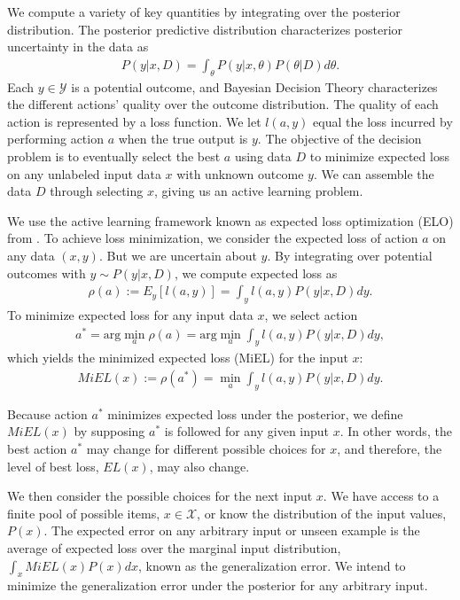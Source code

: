 \documentclass[a4paper,11pt]{article}
\begin{document}
We compute a variety of key quantities by integrating over the posterior distribution. The posterior predictive distribution characterizes posterior uncertainty in the data as
\begin{align} 
P(y|x,D) = \int_\theta P(y|x,\theta)P(\theta|D)d\theta .
\end{align}
Each $y \in \mathcal{Y}$ is a potential outcome, and Bayesian Decision Theory characterizes the different actions' quality over the outcome distribution. The quality of each action is represented by a loss function. We let $l(a,y)$ equal the loss incurred by performing action $a$ when the true output is $y$. The objective of the decision problem is to eventually select the best $a$ using data $D$ to minimize expected loss on any unlabeled input data $x$ with unknown outcome $y$. We can assemble the data $D$ through selecting $x$, giving us an active learning problem.

We use the active learning framework known as expected loss optimization (ELO) from \cite{long2010elo}. To achieve loss minimization, we consider the expected loss of action $a$ on any data  $(x,y)$. But we are uncertain about $y$. By integrating over potential outcomes with $y \sim P(y|x,D)$, we compute expected loss as
\begin{align}
\rho(a) := E_{y} \left[ l(a,y) \right] = \int_y l(a,y) P(y|x,D) dy .
\end{align}To minimize expected loss for any input data $x$, we select action
\begin{align}
a^{*} = \text{arg}\min_a \rho(a) = \text{arg}\min_a \int_y l(a,y) P(y|x,D) dy,
\end{align}which yields the minimized expected loss (MiEL) for the input $x$:
\begin{align}
MiEL(x) := \rho(a^{*}) = \min_a \int_y l(a,y) P(y|x,D) dy .
\end{align}

Because action $a^{*}$ minimizes expected loss under the posterior, we define $MiEL(x)$ by supposing $a^{*}$ is followed for any given input $x$. In other words, the best action $a^{*}$ may change for different possible choices for $x$, and therefore, the level of best loss, $EL(x)$, may also change. 

We then consider the possible choices for the next input $x$. We have access to a finite pool of possible items, $x \in \mathcal{X}$, or know the distribution of the input values, $P(x)$. The expected error on any arbitrary input or unseen example is the average of expected loss over the marginal input distribution, $\int_x MiEL(x)P(x)dx$, known as the generalization error. We intend to minimize the generalization error under the posterior for any arbitrary input.
\end{document}
